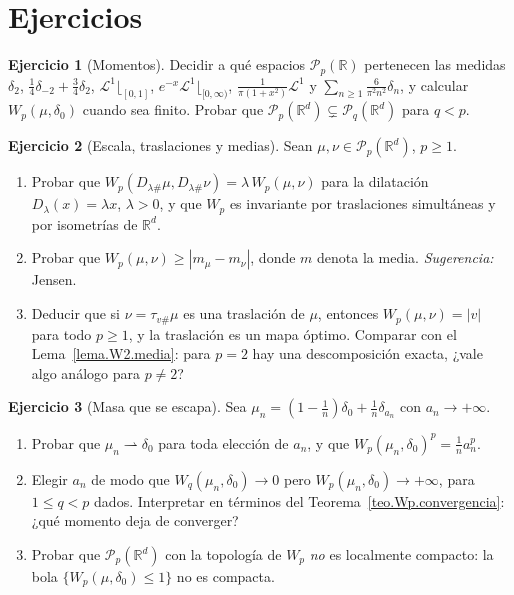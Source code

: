 \documentclass[12pt, a4paper]{amsbook}
\newcommand{\R}{{\mathbb R}}
\newcommand{\LL}{{\mathcal L}}
\theoremstyle{remark}
\theoremstyle{definition}
\newtheorem{ejercicio}{Ejercicio}[chapter]
\numberwithin{section}{chapter}
\numberwithin{subsection}{section}
\numberwithin{equation}{section}
\numberwithin{figure}{chapter}
\begin{document}

\section*{Ejercicios}

\begin{ejercicio}[Momentos]\label{ejer.Wp.momentos}
Decidir a qué espacios $\mathcal P_p(\R)$ pertenecen las medidas
$\delta_2$, $\frac14\delta_{-2}+\frac34\delta_2$, $\LL^1\lfloor_{[0,1]}$,
$e^{-x}\LL^1\lfloor_{[0,\infty)}$, $\frac{1}{\pi(1+x^2)}\LL^1$ y
$\sum_{n\ge1}\frac{6}{\pi^2n^2}\delta_n$, y calcular $W_p(\mu,\delta_0)$
cuando sea finito. Probar que $\mathcal P_p(\R^d)\subsetneq\mathcal P_q(\R^d)$
para $q<p$.
\end{ejercicio}

\begin{ejercicio}[Escala, traslaciones y medias]\label{ejer.Wp.escala}
Sean $\mu,\nu\in\mathcal P_p(\R^d)$, $p\ge1$.
\begin{enumerate}[label=(\alph*)]
\item Probar que $W_p(D_{\lambda\#}\mu,D_{\lambda\#}\nu)=\lambda\,W_p(\mu,\nu)$
para la dilatación $D_\lambda(x)=\lambda x$, $\lambda>0$, y que $W_p$ es
invariante por traslaciones simultáneas y por isometrías de $\R^d$.
\item Probar que $W_p(\mu,\nu)\ge|m_\mu-m_\nu|$, donde $m$ denota la media.
\emph{Sugerencia:} Jensen.
\item Deducir que si $\nu=\tau_{v\#}\mu$ es una traslación de $\mu$,
entonces $W_p(\mu,\nu)=|v|$ para todo $p\ge1$, y la traslación es un mapa
óptimo. Comparar con el Lema~\ref{lema.W2.media}: para $p=2$ hay una
descomposición exacta, ¿vale algo análogo para $p\ne2$?
\end{enumerate}
\end{ejercicio}

\begin{ejercicio}[Masa que se escapa]\label{ejer.Wp.escape}
Sea $\mu_n=(1-\frac1n)\delta_0+\frac1n\delta_{a_n}$ con $a_n\to+\infty$.
\begin{enumerate}[label=(\alph*)]
\item Probar que $\mu_n\rightharpoonup\delta_0$ para toda elección de
$a_n$, y que $W_p(\mu_n,\delta_0)^p=\frac1na_n^p$.
\item Elegir $a_n$ de modo que $W_q(\mu_n,\delta_0)\to0$ pero
$W_p(\mu_n,\delta_0)\to+\infty$, para $1\le q<p$ dados. Interpretar en
términos del Teorema~\ref{teo.Wp.convergencia}: ¿qué momento deja de
converger?
\item Probar que $\mathcal P_p(\R^d)$ con la topología de $W_p$ \emph{no} es
localmente compacto: la bola $\{W_p(\mu,\delta_0)\le1\}$ no es compacta.
\end{enumerate}
\end{ejercicio}
\end{document}

